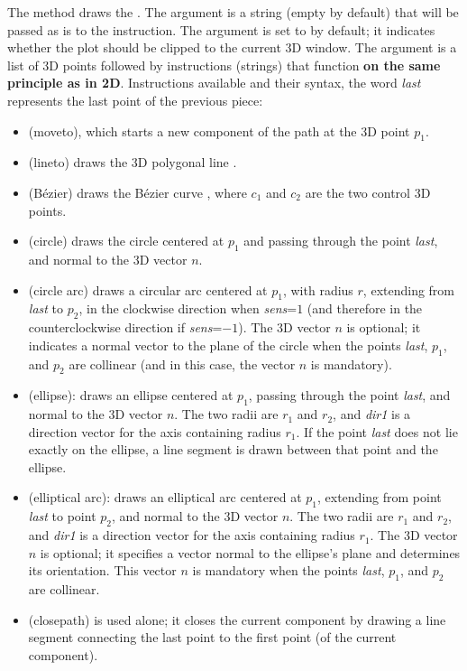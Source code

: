 The method  draws the . The  argument is a string (empty by default) that will be passed as is to the \drawcmd instruction. The  argument is set to \false by default; it indicates whether the plot should be clipped to the current 3D window. The  argument is a list of 3D points followed by instructions (strings) that function \textbf{on the same principle as in 2D}. Instructions available and their syntax, the word \emph{last} represents the last point of the previous piece:
\begin{itemize}
    \item {} (moveto), which starts a new component of the path at the 3D point $p_1$.

    \item {} (lineto) draws the 3D polygonal line .

    \item {} (Bézier) draws the Bézier curve , where $c_1$ and $c_2$ are the two control 3D points.

    \item {} (circle) draws the circle centered at $p_1$ and passing through the point \emph{last}, and normal to the 3D vector $n$. 

    \item {} (circle arc) draws a circular arc centered at $p_1$, with radius $r$, extending from \emph{last} to $p_2$, in the clockwise direction when \emph{sens}=$1$ (and therefore in the counterclockwise direction if \emph{sens}=$-1$). The 3D vector $n$ is optional; it indicates a normal vector to the plane of the circle when the points \emph{last}, $p_1$, and $p_2$ are collinear (and in this case, the vector $n$ is mandatory).

    \item {} (ellipse): draws an ellipse centered at $p_1$, passing through the point \emph{last}, and normal to the 3D vector $n$. The two radii are $r_1$ and $r_2$, and \emph{dir1} is a direction vector for the axis containing radius $r_1$. If the point \emph{last} does not lie exactly on the ellipse, a line segment is drawn between that point and the ellipse.

    \item {} (elliptical arc): draws an elliptical arc centered at $p_1$, extending from point \emph{last} to point $p_2$, and normal to the 3D vector $n$. The two radii are $r_1$ and $r_2$, and \emph{dir1} is a direction vector for the axis containing radius $r_1$. The 3D vector $n$ is optional; it specifies a vector normal to the ellipse's plane and determines its orientation. This vector $n$ is mandatory when the points \emph{last}, $p_1$, and $p_2$ are collinear.

    \item {} (closepath) is used alone; it closes the current component by drawing a line segment connecting the last point to the first point (of the current component).
\end{itemize}

